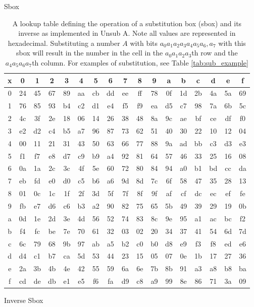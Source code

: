 \documentclass[12pt,a4paper]{article}
\begin{document}
\begin{table}[P]
\begin{subtable}[b]{\textwidth}
    \caption{Sbox}
    \label{tab:sbox}
\end{subtable}
\begin{subtable}[b]{\textwidth}
    \centering
    \begin{tabular}{|c||c|c|c|c|c|c|c|c|c|c|c|c|c|c|c|c|} 
    \hline
    x  & 0 & 1 & 2 & 3 & 4 & 5 & 6 & 7 & 8 & 9 & a & b & c & d & e & f  \\
    \hline \hline
    0 & 24 & 45 & 67 & 89 & aa & cb & dd & ee & ff & 78 & 0f & 1d & 2b & 4a & 5a & 69 \\ \hline
    1 & 76 & 85 & 93 & b4 & c2 & d1 & e4 & f5 & f9 & ea & d5 & c7 & 98 & 7a & 6b & 5c \\ \hline
    2 & 4c & 3f & 2e & 18 & 06 & 14 & 26 & 38 & 48 & 8a & 9c & ae & bf & ce & df & f0 \\ \hline
    3 & e2 & d2 & c4 & b5 & a7 & 96 & 87 & 73 & 62 & 51 & 40 & 30 & 22 & 10 & 12 & 04 \\ \hline
    4 & 00 & 11 & 21 & 31 & 43 & 50 & 63 & 66 & 77 & 88 & 9a & ad & bb & c3 & d3 & e3 \\ \hline
    5 & f1 & f7 & e8 & d7 & c9 & b9 & a4 & 92 & 81 & 64 & 57 & 46 & 33 & 25 & 16 & 08 \\ \hline
    6 & 0a & 1a & 2c & 3c & 4f & 5e & 60 & 72 & 80 & 84 & 94 & a0 & b1 & bd & cc & da \\ \hline
    7 & eb & fd & e0 & d0 & c5 & b6 & a6 & 9d & 8d & 7c & 6f & 58 & 47 & 35 & 28 & 13 \\ \hline
    8 & 01 & 0c & 1c & 1f & 2f & 3d & 5f & 7f & 8f & 9f & af & cf & dc & ec & ef & fe \\ \hline
    9 & fb & e7 & d6 & c6 & b3 & a2 & 90 & 82 & 75 & 65 & 5b & 49 & 39 & 29 & 19 & 0b \\ \hline
    a & 0d & 1e & 2d & 3e & 4d & 56 & 52 & 74 & 83 & 8c & 9e & 95 & a1 & ac & bc & f2 \\ \hline
    b & f4 & fc & be & 7e & 70 & 61 & 32 & 03 & 02 & 20 & 34 & 37 & 41 & 54 & 6d & 7d \\ \hline
    c & 6c & 79 & 68 & 9b & 97 & ab & a5 & b2 & c0 & b0 & d8 & e9 & f3 & f8 & ed & e6 \\ \hline
    d & d4 & c1 & b7 & ca & 5d & 53 & 44 & 23 & 15 & 05 & 07 & 0e & 1b & 17 & 27 & 36 \\ \hline
    e & 2a & 3b & 4b & 4e & 42 & 55 & 59 & 6a & 6e & 7b & 8b & 91 & a3 & a8 & b8 & ba \\ \hline
    f & cd & de & db & e1 & e5 & f6 & fa & d9 & c8 & a9 & 99 & 8e & 86 & 71 & 3a & 09 \\ \hline
    \end{tabular}
    \caption{Inverse Sbox}
    \label{tab:inv_sbox}
\end{subtable}
\caption[Substitution Layer Definition for UnsubA]{A lookup table defining the operation of a substitution box (sbox) and
its inverse as implemented in Unsub A. Note all values are represented in hexadecimal. 
Substituting a number $A$ with bits $a_0a_1a_2a_3a_4a_5a_6,a_7$ with this
sbox will result in the number in the cell in the $a_0a_1a_2a_3$th row and the
$a_4a_5a_6a_7$th column. For examples of substitution, see Table
\ref{tab:sub_example}}
\end{table}
\end{document}

